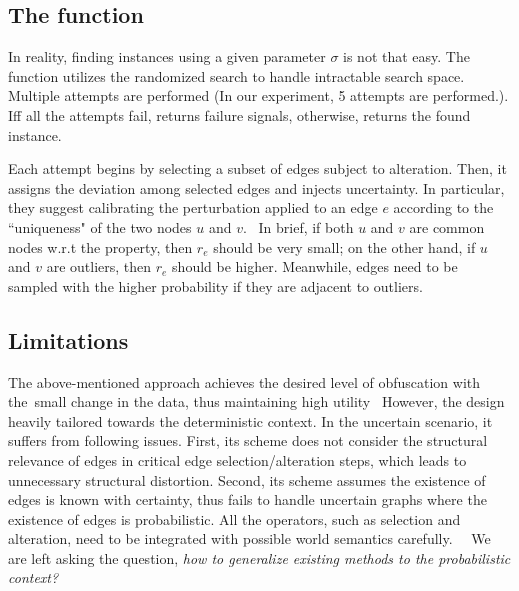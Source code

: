 \subsection{The function {\genobf}}
In reality, finding {\keobf} instances using a given parameter $\sigma$ is not that easy.
The function {\genobf} utilizes the randomized search to handle intractable search space. Multiple attempts are performed (In our experiment, 5 attempts are performed.). Iff all the attempts fail, {\genobf} returns failure signals, otherwise, returns the found {\keobf} instance. 

Each attempt begins by selecting a subset of edges subject to alteration. Then, it assigns the deviation among selected edges and injects uncertainty. 
In particular, they suggest calibrating the perturbation applied to an edge $e$ according to the ``uniqueness" of the two nodes $u$ and $v$. 
In brief, if both $u$ and $v$ are common nodes w.r.t the property, then $r_{e}$ should be very small; on the other hand, if $u$ and $v$ are outliers, then $r_{e}$ should be higher. Meanwhile, edges need to be sampled with the higher probability if they are adjacent to outliers. 


\subsection{Limitations} 
The above-mentioned approach achieves the desired level of obfuscation with the small change in the data, thus maintaining high utility 
However, the design heavily tailored towards the deterministic context. In the uncertain scenario, it suffers from following issues. 
First, its scheme does not consider the structural relevance of edges in critical edge selection/alteration steps, which leads to unnecessary structural distortion. 
Second, its scheme assumes the existence of edges is known with certainty, thus fails to handle uncertain graphs where the existence of edges is probabilistic. 
All the operators, such as selection and alteration, need to be integrated with possible world semantics carefully.  
We are left asking the question, \emph{how to generalize existing methods to the probabilistic context?}



